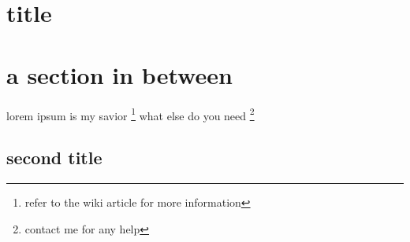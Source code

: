 \documentclass{article}
\begin{document}
	\section{title}
	\lipsum[1-2]
	
	\pagebreak
	\section{a section in between}
	\lipsum[1-2]
	lorem ipsum is my savior \footnote{refer to the wiki article for more information} what else do you need \footnote{contact me for any help}
	
	\begin{landscape}
		\section{second title}
		\lipsum[1-2]
	\end{landscape}

	\lipsum[1-10]
\end{document}
